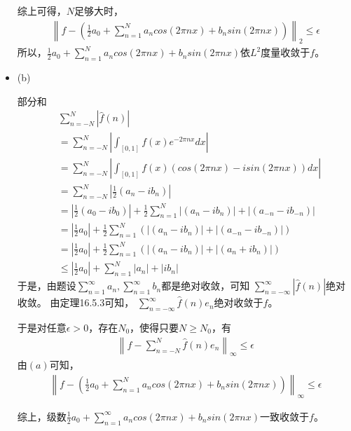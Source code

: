 \documentclass{article}
\begin{document}
\begin{itemize}
        综上可得，$N$足够大时，
        \begin{align*}
          \left\|f - (\frac{1}{2}a_0 + \sum\limits_{n = 1}^N a_n cos(2\pi nx) +b_nsin(2\pi nx)) \right\|_2 \leq \epsilon
        \end{align*}
        所以，$\frac{1}{2}a_0 + \sum\limits_{n = 1}^N a_n cos(2\pi nx) +b_nsin(2\pi nx)$依$L^2$度量收敛于$f$。

  \item (b)

        部分和
        \begin{align*}
           & \sum \limits_{n = -N}^N |\hat{f}(n)|                                                                    \\
           & = \sum \limits_{n = -N}^N |\int_{[0, 1]} f(x)e^{-2\pi n x} dx|                                          \\
           & = \sum \limits_{n = -N}^N |\int_{[0, 1]} f(x)(cos(2\pi nx) - isin(2\pi nx)) dx|                         \\
           & = \sum \limits_{n = -N}^N |\frac{1}{2} (a_n - ib_n)|                                                    \\
           & = |\frac{1}{2} (a_0 - ib_0)| + \frac{1}{2} \sum \limits_{n = 1}^N |(a_n - ib_n)| + |(a_{-n} - ib_{-n})| \\
           & = |\frac{1}{2} a_0| + \frac{1}{2} \sum \limits_{n = 1}^N (|(a_n - ib_n)| + |(a_{-n} - ib_{-n})|)        \\
           & = |\frac{1}{2} a_0| + \frac{1}{2} \sum \limits_{n = 1}^N (|(a_n - ib_n)| + |(a_{n} + ib_{n})|)          \\
           & \leq |\frac{1}{2} a_0| + \sum \limits_{n = 1}^N |a_n| + |ib_n|
        \end{align*}
        于是，由题设$\sum \limits_{n = 1}^\infty a_n, \sum \limits_{n = 1}^\infty b_n$都是绝对收敛，可知
        $\sum \limits_{n = -\infty}^\infty |\hat{f}(n)|$绝对收敛。
        由定理16.5.3可知，
        $\sum \limits_{n = -\infty}^\infty \hat{f}(n)e_n$绝对收敛于$f$。

        于是对任意$\epsilon > 0$，存在$N_0$，使得只要$N \geq N_0$，有
        \begin{align*}
          \left\|f - \sum \limits_{n = -N}^N \hat{f}(n)e_n \right\|_{\infty} \leq \epsilon
        \end{align*}
        由$(a)$可知，
        \begin{align*}
          \left\|f - (\frac{1}{2}a_0 + \sum\limits_{n = 1}^N a_n cos(2\pi nx) +b_nsin(2\pi nx)) \right\|_{\infty} \leq \epsilon
        \end{align*}

        综上，级数$\frac{1}{2}a_0 + \sum\limits_{n = 1}^\infty a_n cos(2\pi nx) +b_nsin(2\pi nx)$一致收敛于$f$。

\end{itemize}
\end{document}

